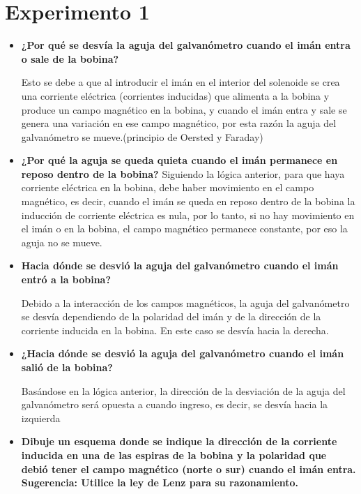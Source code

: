 \documentclass[letterpaper, 12pt]{report}
\begin{document}
\section*{Experimento 1}

\begin{itemize}[label=$\bullet$]
      \item \textbf{¿Por qué se desvía la aguja del galvanómetro cuando el imán entra o sale de la bobina?}

            Esto se debe a que al introducir el imán en el interior del
            solenoide se crea una corriente eléctrica (corrientes
            inducidas) que alimenta a la bobina y produce un campo
            magnético en la bobina, y cuando el imán entra y sale se
            genera una variación en ese campo magnético, por esta razón
            la aguja del galvanómetro se mueve.\@(principio de Oersted
            y Faraday)

      \item \textbf{¿Por qué la aguja se queda quieta cuando el imán permanece en reposo dentro de la
                  bobina?}
            Siguiendo la lógica anterior, para que haya corriente eléctrica en la bobina, debe haber
            movimiento en el campo magnético, es decir, cuando el imán se queda en reposo
            dentro de la bobina la inducción de corriente eléctrica es nula, por lo tanto, si no hay
            movimiento en el imán o en la bobina, el campo magnético permanece constante, por
            eso la aguja no se mueve.

      \item \textbf{Hacia dónde se desvió la aguja del galvanómetro cuando el
                  imán entró a la bobina?}

            Debido a la interacción de los campos magnéticos, la aguja
            del galvanómetro se desvía dependiendo de la polaridad del
            imán y de la dirección de la corriente inducida en la
            bobina. En este caso se desvía hacia la derecha.

      \item \textbf{¿Hacia dónde se desvió la aguja del galvanómetro cuando el imán
                  salió de la bobina?}

            Basándose en la lógica anterior, la dirección de la
            desviación de la aguja del galvanómetro será opuesta a
            cuando ingreso, es decir, se desvía hacia la izquierda

      \item \textbf{Dibuje un esquema donde se indique la dirección de la
                  corriente inducida en una de las espiras de la bobina y la
                  polaridad que debió tener el campo magnético (norte o sur)
                  cuando el imán entra. Sugerencia: Utilice la ley de Lenz
                  para su razonamiento.}


\end{itemize}
\end{document}
